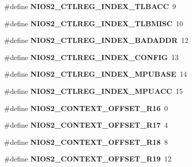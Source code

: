 \begin{DoxyCompactItemize}
\#define {\bfseries N\+I\+O\+S2\+\_\+\+C\+T\+L\+R\+E\+G\+\_\+\+I\+N\+D\+E\+X\+\_\+\+T\+L\+B\+A\+CC}~9
\item 
\mbox{\label{nios2-utility_8h_a90d72c6df37bb7cc52f754e57bdfe9fa}} 
\#define {\bfseries N\+I\+O\+S2\+\_\+\+C\+T\+L\+R\+E\+G\+\_\+\+I\+N\+D\+E\+X\+\_\+\+T\+L\+B\+M\+I\+SC}~10
\item 
\mbox{\label{nios2-utility_8h_adec06b0a51bc5c2b0d40d1b992c50b35}} 
\#define {\bfseries N\+I\+O\+S2\+\_\+\+C\+T\+L\+R\+E\+G\+\_\+\+I\+N\+D\+E\+X\+\_\+\+B\+A\+D\+A\+D\+DR}~12
\item 
\mbox{\label{nios2-utility_8h_aaf37986ca95e54ec9adee1cf877596af}} 
\#define {\bfseries N\+I\+O\+S2\+\_\+\+C\+T\+L\+R\+E\+G\+\_\+\+I\+N\+D\+E\+X\+\_\+\+C\+O\+N\+F\+IG}~13
\item 
\mbox{\label{nios2-utility_8h_a74755d1737a6f7a240216be10781b0f8}} 
\#define {\bfseries N\+I\+O\+S2\+\_\+\+C\+T\+L\+R\+E\+G\+\_\+\+I\+N\+D\+E\+X\+\_\+\+M\+P\+U\+B\+A\+SE}~14
\item 
\mbox{\label{nios2-utility_8h_a782e388e422748538d737c69cd9812ab}} 
\#define {\bfseries N\+I\+O\+S2\+\_\+\+C\+T\+L\+R\+E\+G\+\_\+\+I\+N\+D\+E\+X\+\_\+\+M\+P\+U\+A\+CC}~15
\item 
\mbox{\label{nios2-utility_8h_a33b15193dc26a23d4264ab2973ab8c87}} 
\#define {\bfseries N\+I\+O\+S2\+\_\+\+C\+O\+N\+T\+E\+X\+T\+\_\+\+O\+F\+F\+S\+E\+T\+\_\+\+R16}~0
\item 
\mbox{\label{nios2-utility_8h_a7d72d50ae2de1f3c9b938fc7f73a476f}} 
\#define {\bfseries N\+I\+O\+S2\+\_\+\+C\+O\+N\+T\+E\+X\+T\+\_\+\+O\+F\+F\+S\+E\+T\+\_\+\+R17}~4
\item 
\mbox{\label{nios2-utility_8h_a1bc90f255ed08a2ec68516ad46225191}} 
\#define {\bfseries N\+I\+O\+S2\+\_\+\+C\+O\+N\+T\+E\+X\+T\+\_\+\+O\+F\+F\+S\+E\+T\+\_\+\+R18}~8
\item 
\mbox{\label{nios2-utility_8h_ac47b8959b3133e794b30d694fe98c6f6}} 
\#define {\bfseries N\+I\+O\+S2\+\_\+\+C\+O\+N\+T\+E\+X\+T\+\_\+\+O\+F\+F\+S\+E\+T\+\_\+\+R19}~12

\end{DoxyCompactItemize}
